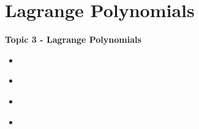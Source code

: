 \documentclass[fleqn]{beamer} %
\newcommand{\sectionIVtitle}{Lagrange Polynomials}
\newcommand{\sectionIVsubsectionItitle}{}
\newcommand{\sectionIVsubsectionIItitle}{}
\newcommand{\sectionIVsubsectionIIItitle}{}
\newcommand{\sectionIVsubsectionIVtitle}{}
\begin{document}
	
	\section{\sectionIVtitle}\label{sectionIV}

		\begin{frame}
			\large \textbf{Topic 3 - \sectionIVtitle} \vspace{3mm}\\

			\begin{itemize}
				\item \hyperlink{sectionIVsubsectionI}{\sectionIVsubsectionItitle} \vspc %
				\item \hyperlink{sectionIVsubsectionII}{\sectionIVsubsectionIItitle} \vspc %
				\item \hyperlink{sectionIVsubsectionIII}{\sectionIVsubsectionIIItitle} \vspc %
				\item \hyperlink{sectionIVsubsectionIV}{\sectionIVsubsectionIVtitle} \vspc %
			\end{itemize}

		\end{frame}

		\subsection{\sectionIVsubsectionItitle}\label{sectionIVsubsectionI}

			\begin{frame}
				\frametitle{\sectionIVsubsectionItitle}
				\bigskip

		
				\btVFill
			\end{frame}

		\subsection{\sectionIVsubsectionIItitle}\label{sectionIVsubsectionII}

			\begin{frame}
				\frametitle{\sectionIVsubsectionIItitle}
				\bigskip


				\btVFill
			\end{frame}

			\begin{frame}
				\frametitle{\sectionIVsubsectionIItitle}
				\bigskip


				\btVFill
			\end{frame}	
\end{document}
